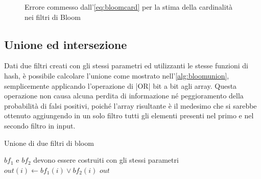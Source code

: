 \begin{figure}
\begin{minipage}[c]{0.7\textwidth}
{		}
	\end{minipage}
	\qquad
	\begin{minipage}[c]{0.7\textwidth}
	\end{minipage}

	\caption{Errore commesso dall'\autoref{eq:bloomcard} per la stima della car\-di\-na\-li\-tà nei
	filtri di Bloom}
	\label{fig:bloomerror}
\end{figure}

\subsection{Unione ed intersezione}

Dati due filtri creati con gli stessi parametri ed utilizzanti le stesse funzioni di hash, è
possibile calcolare l'unione come mostrato nell'\autoref{alg:bloomunion}, semplicemente applicando
l'operazione di \cverb|OR| bit a bit agli array. Questa operazione non causa alcuna perdita di
informazione né peggioramento della probabilità di falsi positivi, poiché l'array risultante è il
medesimo che si sarebbe ottenuto aggiungendo in un solo filtro tutti gli elementi presenti nel primo
e nel secondo filtro in input.

\begin{algorithm}
\caption{Unione di due filtri di bloom}
\label{alg:bloomunion}
\begin{algorithmic}[1]
\Require $bf_1$ e $bf_2$ devono essere costruiti con gli stessi pa\-ra\-me\-tri
		\State $out(i) \gets bf_1(i) \lor bf_2(i)$
	\EndFor
	\State \Return $out$
\EndProcedure
\end{algorithmic}
\end{algorithm}


